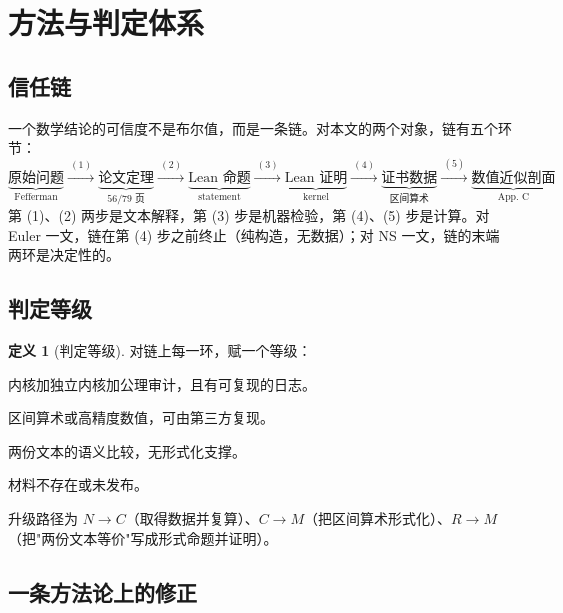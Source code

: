 \documentclass[11pt,a4paper]{ctexart}
\theoremstyle{definition}
\newtheorem{definition}[theorem]{定义}
\begin{document}
\section{方法与判定体系}\label{sec:method}

\subsection{信任链}

一个数学结论的可信度不是布尔值，而是一条链。对本文的两个对象，链有五个环节：
\begin{equation}\label{eq:chain}
\underbrace{\text{原始问题}}_{\text{Fefferman}}
\xrightarrow{\ (1)\ }
\underbrace{\text{论文定理}}_{\text{56/79 页}}
\xrightarrow{\ (2)\ }
\underbrace{\text{Lean 命题}}_{\text{statement}}
\xrightarrow{\ (3)\ }
\underbrace{\text{Lean 证明}}_{\text{kernel}}
\xrightarrow{\ (4)\ }
\underbrace{\text{证书数据}}_{\text{区间算术}}
\xrightarrow{\ (5)\ }
\underbrace{\text{数值近似剖面}}_{\text{App. C}}
\end{equation}
第 (1)、(2) 两步是文本解释，第 (3) 步是机器检验，第 (4)、(5) 步是计算。对 Euler 一文，链在第 (4) 步之前终止（纯构造，无数据）；对 NS 一文，链的末端两环是决定性的。

\subsection{判定等级}

\begin{definition}[判定等级]
对链上每一环，赋一个等级：
\begin{description}[leftmargin=2.2em,style=nextline]
\item[$M$（机器验证）] 内核加独立内核加公理审计，且有可复现的日志。
\item[$C$（计算验证）] 区间算术或高精度数值，可由第三方复现。
\item[$R$（需人审读）] 两份文本的语义比较，无形式化支撑。
\item[$N$（无证据）] 材料不存在或未发布。
\end{description}
升级路径为 $N\to C$（取得数据并复算）、$C\to M$（把区间算术形式化）、$R\to M$（把"两份文本等价"写成形式命题并证明）。
\end{definition}

\subsection{一条方法论上的修正}
\end{document}

